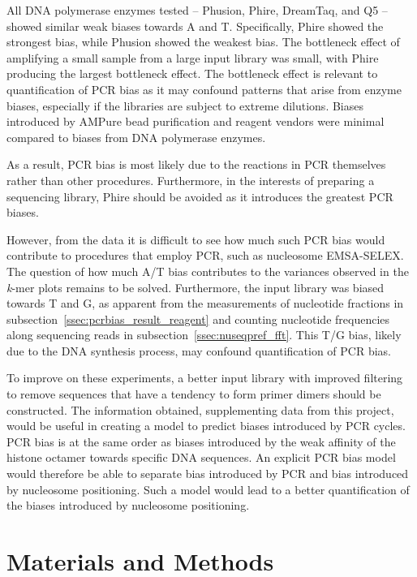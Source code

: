 \documentclass[parskip=full, numbers=noenddot]{scrbook}
\begin{document}
All DNA polymerase enzymes tested -- Phusion, Phire, DreamTaq, and Q5  -- showed similar weak biases towards A and T.  Specifically, Phire showed the strongest bias, while Phusion showed the weakest bias.  The bottleneck effect of amplifying a small sample from a large input library was small, with Phire producing the largest bottleneck effect.  The bottleneck effect is relevant to quantification of PCR bias as it may confound patterns that arise from enzyme biases, especially if the libraries are subject to extreme dilutions.  Biases introduced by AMPure bead purification and reagent vendors were minimal compared to biases from DNA polymerase enzymes.

As a result, PCR bias is most likely due to the reactions in PCR themselves rather than other procedures.  Furthermore, in the interests of preparing a sequencing library, Phire should be avoided as it introduces the greatest PCR biases.

However, from the data it is difficult to see how much such PCR bias would contribute to procedures that employ PCR, such as nucleosome EMSA-SELEX.  The question of how much A/T bias contributes to the variances observed in the \emph{k}-mer plots remains to be solved.  Furthermore, the input library was biased towards T and G, as apparent from the measurements of nucleotide fractions in subsection~\ref{ssec:pcrbias_result_reagent} and counting nucleotide frequencies along sequencing reads in subsection~\ref{ssec:nuseqpref_fft}.  This T/G bias, likely due to the DNA synthesis process, may confound quantification of PCR bias.

To improve on these experiments, a better input library with improved filtering to remove sequences that have a tendency to form primer dimers should be constructed.  The information obtained, supplementing data from this project, would be useful in creating a model to predict biases introduced by PCR cycles.  PCR bias is at the same order as biases introduced by the weak affinity of the histone octamer towards specific DNA sequences.  An explicit PCR bias model would therefore be able to separate bias introduced by PCR and bias introduced by nucleosome positioning.  Such a model would lead to a better quantification of the biases introduced by nucleosome positioning.

\section{Materials and Methods}
\label{sec:pcrbias_methods}
\end{document}
